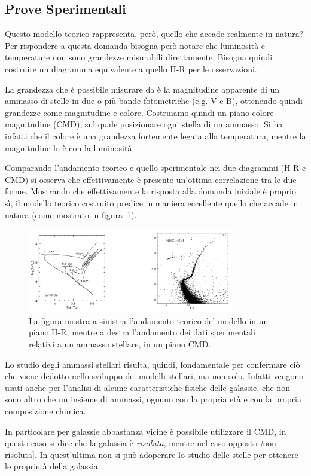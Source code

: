 \subsection{Prove Sperimentali}

Questo modello teorico rappresenta, però, quello che accade realmente in natura? Per rispondere a questa domanda bisogna però notare che luminosità e temperature non sono grandezze misurabili direttamente. Bisogna quindi costruire un diagramma equivalente a quello H-R per le osservazioni.

La grandezza che è possibile misurare da è la magnitudine apparente di un ammasso di stelle in due o più bande fotometriche (e.g. V e B), ottenendo quindi grandezze come magnitudine e colore. Costruiamo quindi un piano colore-magnitudine (CMD), sul quale posizionare ogni stella di un ammasso. Si ha infatti che il colore è una grandezza fortemente legata alla temperatura, mentre la magnitudine lo è con la luminosità.

Comparando l'andamento teorico e quello sperimentale nei due diagrammi (H-R e CMD) si osserva che effettivamente è presente un'ottima correlazione tra le due forme. Mostrando che effettivamente la risposta alla domanda iniziale è proprio sì, il modello teorico costruito predice in maniera eccellente quello che accade in natura (come mostrato in figura~\ref{fig:modello-osservazione-stellare}).
\begin{figure}
    \centering
    \includegraphics[width = 0.8\textwidth]{immagini/dati-sper-stelle.png}
    \caption{La figura mostra a sinistra l'andamento teorico del modello in un piano H-R, mentre a destra l'andamento dei dati sperimentali relativi a un ammasso stellare, in un piano CMD.}\label{fig:modello-osservazione-stellare}
\end{figure}

Lo studio degli ammassi stellari risulta, quindi, fondamentale per confermare ciò che viene dedotto nello sviluppo dei modelli stellari, ma non solo. Infatti vengono usati anche per l'analisi di alcune caratteristiche fisiche delle galassie, che non sono altro che un insieme di ammassi, ognuno con la propria età e con la propria composizione chimica.

In particolare per galassie abbastanza vicine è possibile utilizzare il CMD, in questo caso si dice che la galassia è \emph{risoluta}, mentre nel caso opposto \emph[non risoluta]. In quest'ultima non si può adoperare lo studio delle stelle per ottenere le proprietà della galassia.